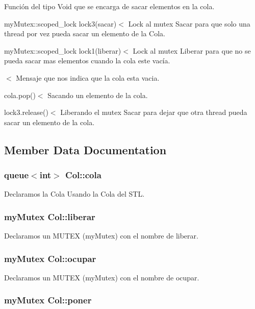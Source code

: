 Función del tipo Void que se encarga de sacar elementos en la cola. 



myMutex::scoped\_\-lock lock3(sacar)$<$ Lock al mutex Sacar para que solo una thread por vez pueda sacar un elemento de la Cola.

myMutex::scoped\_\-lock lock1(liberar)$<$ Lock al mutex Liberar para que no se pueda sacar mas elementos cuando la cola este vacía.

$<$ Mensaje que nos indica que la cola esta vacia.

cola.pop()$<$ Sacando un elemento de la cola.

lock3.release()$<$ Liberando el mutex Sacar para dejar que otra thread pueda sacar un elemento de la cola. 



\subsection{Member Data Documentation}
\hypertarget{classCol_a6b757acfe15a0bb5bfc478a6cf5e9b1e}{
\subsubsection[{cola}]{\setlength{\rightskip}{0pt plus 5cm}queue$<$int$>$ {\bf Col::cola}}}
\label{classCol_a6b757acfe15a0bb5bfc478a6cf5e9b1e}
Declaramos la Cola Usando la Cola del STL. \hypertarget{classCol_a02956b9b92b2191de61400a0f53e1063}{
\subsubsection[{liberar}]{\setlength{\rightskip}{0pt plus 5cm}myMutex {\bf Col::liberar}}}
\label{classCol_a02956b9b92b2191de61400a0f53e1063}
Declaramos un MUTEX (myMutex) con el nombre de liberar. \hypertarget{classCol_aa1a849c7b1c00cc8a8c3dc5e0e1fe4c8}{
\subsubsection[{ocupar}]{\setlength{\rightskip}{0pt plus 5cm}myMutex {\bf Col::ocupar}}}
\label{classCol_aa1a849c7b1c00cc8a8c3dc5e0e1fe4c8}
Declaramos un MUTEX (myMutex) con el nombre de ocupar. \hypertarget{classCol_a2a18e81311998ef10ccaaafa3fbcecdc}{
\subsubsection[{poner}]{\setlength{\rightskip}{0pt plus 5cm}myMutex {\bf Col::poner}}}
